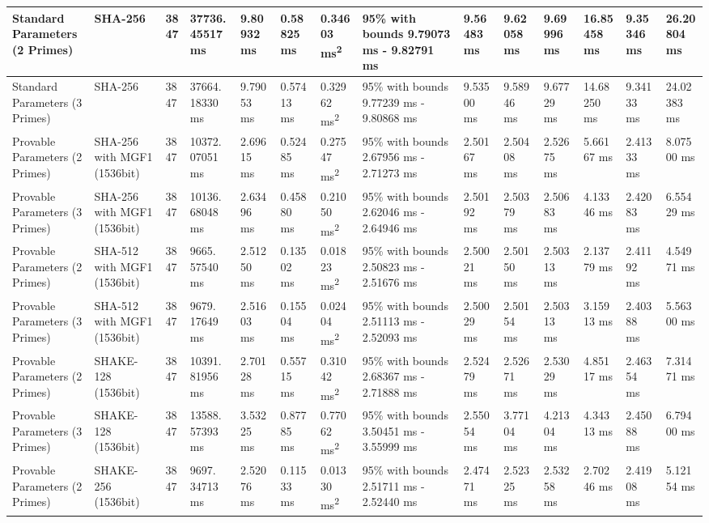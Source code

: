 \documentclass[]{final_report}
\theoremstyle{definition}
\begin{document}
\begin{landscape}
\begin{longtable}{|p{2.3cm}|p{1.8cm}|p{1.0cm}|p{1.7cm}|p{1.4cm}|p{1.5cm}|p{1.8cm}|p{1.5cm}|p{1.43cm}|p{1.5cm}|p{1.3cm}|p{1.4cm}|p{1.3cm}|p{1.3cm}|}
\hline
\endlastfoot
Standard Parameters (2 Primes) & SHA-256 & 3847 & 37736.
45517 ms & 9.80932 ms & 0.58825 ms & 0.34603 ms\textsuperscript{2} & 95\% with bounds 9.79073 ms - 9.82791 ms & 9.56483 ms & 9.62058 ms & 9.69996 ms & 16.85458 ms & 9.35346 ms & 26.20804 ms \\
\hline
Standard Parameters (3 Primes) & SHA-256 & 3847 & 37664.
18330 ms & 9.79053 ms & 0.57413 ms & 0.32962 ms\textsuperscript{2} & 95\% with bounds 9.77239 ms - 9.80868 ms & 9.53500 ms & 9.58946 ms & 9.67729 ms & 14.68250 ms & 9.34133 ms & 24.02383 ms \\
\hline
Provable Parameters (2 Primes) & SHA-256 with MGF1 (1536bit) & 3847 & 10372.
07051 ms & 2.69615 ms & 0.52485 ms & 0.27547 ms\textsuperscript{2} & 95\% with bounds 2.67956 ms - 2.71273 ms & 2.50167 ms & 2.50408 ms & 2.52675 ms & 5.66167 ms & 2.41333 ms & 8.07500 ms \\
\hline
Provable Parameters (3 Primes) & SHA-256 with MGF1 (1536bit) & 3847 & 10136.
68048 ms & 2.63496 ms & 0.45880 ms & 0.21050 ms\textsuperscript{2} & 95\% with bounds 2.62046 ms - 2.64946 ms & 2.50192 ms & 2.50379 ms & 2.50683 ms & 4.13346 ms & 2.42083 ms & 6.55429 ms \\
\hline
Provable Parameters (2 Primes) & SHA-512 with MGF1 (1536bit) & 3847 & 9665.
57540 ms & 2.51250 ms & 0.13502 ms & 0.01823 ms\textsuperscript{2} & 95\% with bounds 2.50823 ms - 2.51676 ms & 2.50021 ms & 2.50150 ms & 2.50313 ms & 2.13779 ms & 2.41192 ms & 4.54971 ms \\
\hline
Provable Parameters (3 Primes) & SHA-512 with MGF1 (1536bit) & 3847 & 9679.
17649 ms & 2.51603 ms & 0.15504 ms & 0.02404 ms\textsuperscript{2} & 95\% with bounds 2.51113 ms - 2.52093 ms & 2.50029 ms & 2.50154 ms & 2.50313 ms & 3.15913 ms & 2.40388 ms & 5.56300 ms \\
\hline
Provable Parameters (2 Primes) & SHAKE-128 (1536bit) & 3847 & 10391.
81956 ms & 2.70128 ms & 0.55715 ms & 0.31042 ms\textsuperscript{2} & 95\% with bounds 2.68367 ms - 2.71888 ms & 2.52479 ms & 2.52671 ms & 2.53029 ms & 4.85117 ms & 2.46354 ms & 7.31471 ms \\
\hline
Provable Parameters (3 Primes) & SHAKE-128 (1536bit) & 3847 & 13588.
57393 ms & 3.53225 ms & 0.87785 ms & 0.77062 ms\textsuperscript{2} & 95\% with bounds 3.50451 ms - 3.55999 ms & 2.55054 ms & 3.77104 ms & 4.21304 ms & 4.34313 ms & 2.45088 ms & 6.79400 ms \\
\hline
Provable Parameters (2 Primes) & SHAKE-256 (1536bit) & 3847 & 9697.
34713 ms & 2.52076 ms & 0.11533 ms & 0.01330 ms\textsuperscript{2} & 95\% with bounds 2.51711 ms - 2.52440 ms & 2.47471 ms & 2.52325 ms & 2.53258 ms & 2.70246 ms & 2.41908 ms & 5.12154 ms \\

\end{longtable}
\end{landscape}
\end{document}
